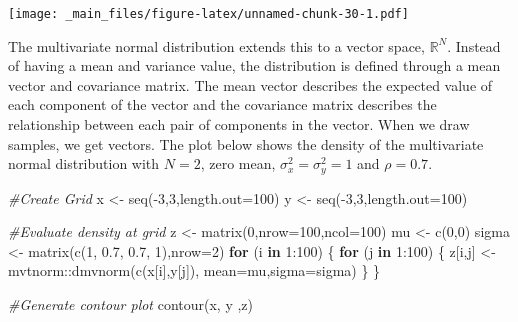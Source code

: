 \documentclass[
]{book}
\newenvironment{Shaded}{\begin{snugshade}}{\end{snugshade}}
\newcommand{\AttributeTok}[1]{\textcolor[rgb]{0.77,0.63,0.00}{#1}}
\newcommand{\CommentTok}[1]{\textcolor[rgb]{0.56,0.35,0.01}{\textit{#1}}}
\newcommand{\ControlFlowTok}[1]{\textcolor[rgb]{0.13,0.29,0.53}{\textbf{#1}}}
\newcommand{\DecValTok}[1]{\textcolor[rgb]{0.00,0.00,0.81}{#1}}
\newcommand{\FloatTok}[1]{\textcolor[rgb]{0.00,0.00,0.81}{#1}}
\newcommand{\FunctionTok}[1]{\textcolor[rgb]{0.00,0.00,0.00}{#1}}
\newcommand{\NormalTok}[1]{#1}
\newcommand{\OtherTok}[1]{\textcolor[rgb]{0.56,0.35,0.01}{#1}}
\newcommand{\SpecialCharTok}[1]{\textcolor[rgb]{0.00,0.00,0.00}{#1}}
\theoremstyle{definition}
\theoremstyle{definition}
\theoremstyle{definition}
\theoremstyle{definition}
\theoremstyle{remark}
\begin{document}
\texttt{[image: \_main\_files/figure-latex/unnamed-chunk-30-1.pdf]}

The multivariate normal distribution extends this to a vector space, \(\mathbb{R}^N\). Instead of having a mean and variance value, the distribution is defined through a mean vector and covariance matrix. The mean vector describes the expected value of each component of the vector and the covariance matrix describes the relationship between each pair of components in the vector. When we draw samples, we get vectors. The plot below shows the density of the multivariate normal distribution with \(N = 2\), zero mean, \(\sigma^2_x = \sigma^2_y = 1\) and \(\rho = 0.7\).

\begin{Shaded}
\begin{Highlighting}[]
\CommentTok{\#Create Grid}
\NormalTok{x }\OtherTok{\textless{}{-}} \FunctionTok{seq}\NormalTok{(}\SpecialCharTok{{-}}\DecValTok{3}\NormalTok{,}\DecValTok{3}\NormalTok{,}\AttributeTok{length.out=}\DecValTok{100}\NormalTok{)}
\NormalTok{y }\OtherTok{\textless{}{-}} \FunctionTok{seq}\NormalTok{(}\SpecialCharTok{{-}}\DecValTok{3}\NormalTok{,}\DecValTok{3}\NormalTok{,}\AttributeTok{length.out=}\DecValTok{100}\NormalTok{)}

\CommentTok{\#Evaluate density at grid}
\NormalTok{z }\OtherTok{\textless{}{-}} \FunctionTok{matrix}\NormalTok{(}\DecValTok{0}\NormalTok{,}\AttributeTok{nrow=}\DecValTok{100}\NormalTok{,}\AttributeTok{ncol=}\DecValTok{100}\NormalTok{)}
\NormalTok{mu }\OtherTok{\textless{}{-}} \FunctionTok{c}\NormalTok{(}\DecValTok{0}\NormalTok{,}\DecValTok{0}\NormalTok{)}
\NormalTok{sigma }\OtherTok{\textless{}{-}} \FunctionTok{matrix}\NormalTok{(}\FunctionTok{c}\NormalTok{(}\DecValTok{1}\NormalTok{, }\FloatTok{0.7}\NormalTok{, }\FloatTok{0.7}\NormalTok{, }\DecValTok{1}\NormalTok{),}\AttributeTok{nrow=}\DecValTok{2}\NormalTok{)}
\ControlFlowTok{for}\NormalTok{ (i }\ControlFlowTok{in} \DecValTok{1}\SpecialCharTok{:}\DecValTok{100}\NormalTok{) \{}
  \ControlFlowTok{for}\NormalTok{ (j }\ControlFlowTok{in} \DecValTok{1}\SpecialCharTok{:}\DecValTok{100}\NormalTok{) \{}
\NormalTok{    z[i,j] }\OtherTok{\textless{}{-}}\NormalTok{ mvtnorm}\SpecialCharTok{::}\FunctionTok{dmvnorm}\NormalTok{(}\FunctionTok{c}\NormalTok{(x[i],y[j]),}
                      \AttributeTok{mean=}\NormalTok{mu,}\AttributeTok{sigma=}\NormalTok{sigma)}
\NormalTok{  \}}
\NormalTok{\}}

\CommentTok{\#Generate contour plot}
\FunctionTok{contour}\NormalTok{(x, y ,z)}
\end{Highlighting}
\end{Shaded}
\end{document}
